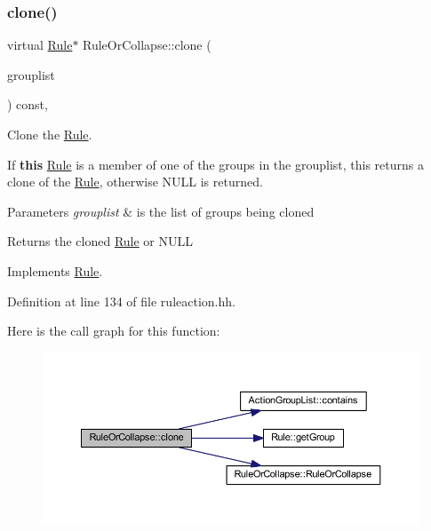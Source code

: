 \subsubsection{\texorpdfstring{clone()}{clone()}}
{\footnotesize\ttfamily virtual \mbox{\hyperlink{class_rule}{Rule}}$\ast$ Rule\+Or\+Collapse\+::clone (\begin{DoxyParamCaption}\item[{const \mbox{\hyperlink{class_action_group_list}{Action\+Group\+List}} \&}]{grouplist }\end{DoxyParamCaption}) const\hspace{0.3cm}{\ttfamily [inline]}, {\ttfamily [virtual]}}



Clone the \mbox{\hyperlink{class_rule}{Rule}}. 

If {\bfseries{this}} \mbox{\hyperlink{class_rule}{Rule}} is a member of one of the groups in the grouplist, this returns a clone of the \mbox{\hyperlink{class_rule}{Rule}}, otherwise N\+U\+LL is returned. 
\begin{DoxyParams}{Parameters}
{\em grouplist} & is the list of groups being cloned \\
\hline
\end{DoxyParams}
\begin{DoxyReturn}{Returns}
the cloned \mbox{\hyperlink{class_rule}{Rule}} or N\+U\+LL 
\end{DoxyReturn}


Implements \mbox{\hyperlink{class_rule_a70de90a76461bfa7ea0b575ce3c11e4d}{Rule}}.



Definition at line 134 of file ruleaction.\+hh.

Here is the call graph for this function\+:
\nopagebreak
\begin{figure}[H]
\begin{center}
\leavevmode
\includegraphics[width=350pt]{class_rule_or_collapse_a30212e0187d8a14ebe2b8adbd396b29a_cgraph}
\end{center}
\end{figure}
\mbox{\label{class_rule_or_collapse_acfa78034c049837894b08b7ce71c2249}} 
